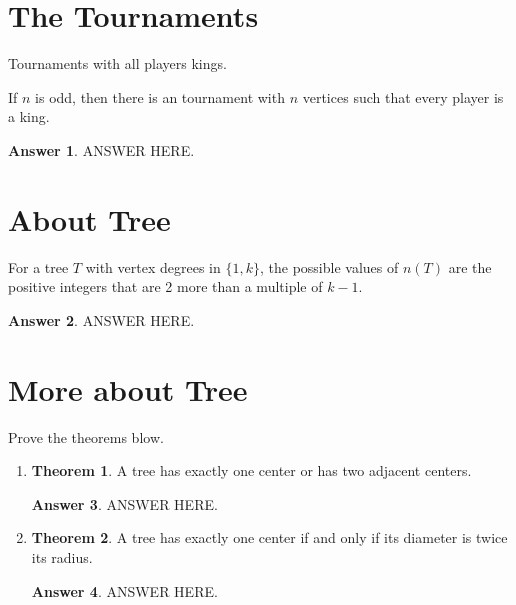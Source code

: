 \documentclass[a4paper]{article}
\renewcommand{\(}{\left(}
\renewcommand{\)}{\right)}
\theoremstyle{plain}
\theoremstyle{plain}
\theoremstyle{definition}
\newtheorem*{answer}{Answer}
\newtheorem{theorem}{Theorem}[section]
\begin{document}
\section{The Tournaments}
Tournaments with all players kings.

 If $n$ is odd, then there is an tournament with $n$ vertices such that every player is a king.
\begin{shaded}
\begin{answer}
ANSWER HERE.
\end{answer}
\end{shaded}


\section{About Tree}
For a tree $T$ with vertex degrees in $\{1, k\}$, the possible values of $n(T)$ are the positive integers that are 2 more than a multiple of $k − 1$.
\begin{shaded}
\begin{answer}
ANSWER HERE.
\end{answer}
\end{shaded}



\section{More about Tree}
Prove the theorems blow.
\begin{enumerate}[label=\Roman*]
  \item {
  \begin{theorem}
A tree has exactly one center or has two adjacent centers.
\end{theorem}
\begin{shaded}
\begin{answer}
ANSWER HERE.
\end{answer}
\end{shaded}
}

  \item {
  \begin{theorem}
A tree has exactly one center if and only if its diameter is twice its radius.
\end{theorem}
\begin{shaded}
\begin{answer}
ANSWER HERE.
\end{answer}
\end{shaded}
}
\end{enumerate}
\end{document}
